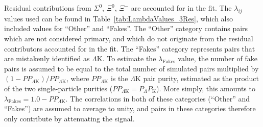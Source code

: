 \documentclass[ALICE,manyauthors]{cernphprep}
\newcommand{\LamK}{$\Lambda$K\xspace}
\begin{document}
Residual contributions from $\Sigma^{0}$, $\Xi^{0}$, $\Xi^{-}$ are accounted for in the fit.
The $\lambda_{ij}$ values used can be found in Table~\ref{tab:LambdaValues_3Res}, which also included values for ``Other'' and ``Fakes''.  
The ``Other'' category contains pairs which are not considered primary, and which do not originate from the residual contributors accounted for in the fit.  
The ``Fakes'' category represents pairs that are mistakenly identified as \LamK.  
To estimate the $\lambda_{\mathrm{Fakes}}$ value, the number of fake pairs is assumed to be equal to the total number of simulated pairs multiplied by $(1-PP_{\Lambda\mathrm{K}})/PP_{\Lambda\mathrm{K}}$, where $PP_{\Lambda\mathrm{K}}$ is the \LamK pair purity, estimated as the product of the two single-particle purities ($PP_{\Lambda\mathrm{K}} = P_{\Lambda}P_{\mathrm{K}}$).
More simply, this amounts to $\lambda_{\mathrm{Fakes}} = 1.0-PP_{\Lambda\mathrm{K}}$.
The correlations in both of these categories (``Other'' and ``Fakes'') are assumed to average to unity, and pairs in these categories therefore only contribute by attenuating the signal. 
\end{document}
